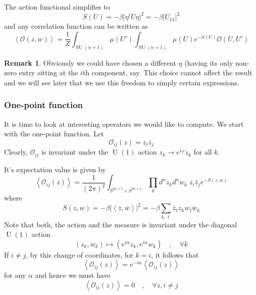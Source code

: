 \documentclass[a4paper,11pt]{article}
\theoremstyle{definition}
\newtheorem{remark}{Remark}
\DeclareMathOperator{\SU}{SU}
\DeclareMathOperator{\U}{U}
\newcommand{\OO}{\mathcal O}
\begin{document}
The action functional simplifies to 
\begin{equation}
  S(U) = - \beta \lvert \eta^t U \eta \rvert^2 = - \beta \lvert U_{11} \rvert^2
\end{equation}
and any correlation function can be written as 
\begin{equation}
  \left\langle \OO(z,w) \right\rangle = \frac{1}{Z} \int_{\SU(n+1)} \mu(U') \int_{\SU(n+1)}\mu(U) e^{-S(U)} \OO(U,U') 
\end{equation}
\begin{remark}
  Obviously we could have chosen a different $\eta$ (having its only non-zero entry sitting at the $i$th component, say.
    This choice cannot affect the result and we will see later that we use this freedom to simply certain expressions.
\end{remark}

\subsubsection{One-point function}
It is time to look at interesting operators we would like to compute.
We start with the one-point function.
Let 
\begin{equation}
  \OO_{ij}(z) = z_i \bar z_j 
\end{equation}
Clearly, $\OO_{ij}$ is invariant under the $\U(1)$ action $z_k \to e^{i\varphi}z_k$ for all $k$.

It's expectation value is given by
\begin{equation}
  \left\langle \OO_{ij}(z) \right\rangle = \frac{1}{(2\pi)^2} \int_{S^{2n+1}\times S^{2n+1}} \prod_k d^nz_k d^nw_k\; z_i \bar z_j e^{- S(z,w)}  
\end{equation}
where 
\begin{equation}
  S(z,w) = - \beta \lvert \left\langle \bar z, w \right\rangle \rvert^2 = - \beta \sum_{k,\ell} \bar z_{\ell} z_k w_{\ell} \bar w_{k} 
\end{equation}
Note that both, the action and the measure is invariant under the diagonal $\U(1)$ action 
\begin{equation}
  (z_k,w_k) \mapsto (e^{i\alpha}z_k, e^{i\alpha}w_k) \quad , \quad \forall k
\end{equation}
If $i \neq j$, by this change of coordinates, for $k=i$, it follows that
\begin{equation}
  \left\langle \OO_{ij}(z) \right\rangle = e^{-i\alpha}\left\langle \OO_{ij}(z) \right\rangle
\end{equation}
for any $\alpha$ and hence we must have
\begin{equation}
  \boxed{
    \left\langle \OO_{ij}(z) \right\rangle = 0 \quad , \quad \forall z, i \neq j 
  }
  \label{eq:toy_one_pt}
\end{equation}
\end{document}
